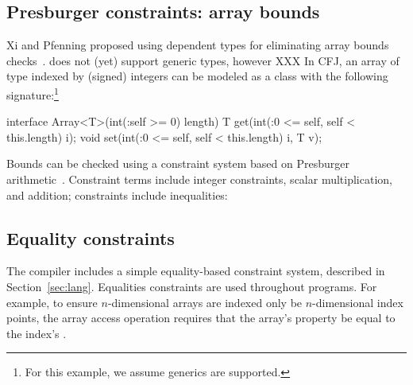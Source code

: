 \subsection{Presburger constraints: array bounds}

Xi and Pfenning proposed using dependent types for eliminating
array bounds checks~\cite{xi98array}.
\Xten{} does not (yet) support generic types, however XXX
%
In CFJ, an array of type  indexed by (signed) integers
can be modeled as a class with the following
signature:\footnote{For this example, we assume generics
are supported.}
\begin{xten}
interface Array<T>(int(:self >= 0) length) {
  T get(int(:0 <= self, self < this.length) i);
  void set(int(:0 <= self, self < this.length) i, T v);
}
\end{xten}

Bounds can be checked using a constraint system based on
Presburger arithmetic~\cite{omega}.  Constraint terms include
integer constraints, scalar multiplication, and addition;
constraints include inequalities:
\fi





\subsection{Equality constraints}

The \Xten{} compiler includes a simple equality-based constraint
system, described in Section~\ref{sec:lang}.
Equalities constraints
are used throughout \Xten{} programs.  For example, to ensure
$n$-dimensional arrays are indexed only be $n$-dimensional
index points, the array access operation requires that the
array's  property be equal to the index's .




